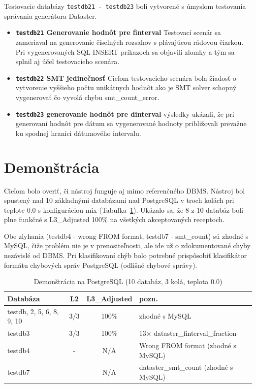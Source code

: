 Testovacie databázy \texttt{testdb21 - testdb23} boli vytvorené s úmyslom testovania správania generátora Dataster.

\begin{itemize}
    \item \textbf{\texttt{testdb21} Generovanie hodnôt pre finterval} Testovací scenár sa zameriaval na generovanie číselných rozsahov s plávajúcou rádovou čiarkou. Pri vygenerovaných SQL INSERT príkazoch sa objavili zlomky a tým sa splnil aj účel testovacieho scenára.
    \item \textbf{\texttt{testdb22} SMT jedinečnosť} Cieľom testovacieho scenára bola žiadosť o vytvorenie vyššieho počtu unikátnych hodnôt ako je SMT solver schopný vygenerovať čo vyvolá chybu smt\_count\_error.
    \item \textbf{\texttt{testdb23} generovanie hodnôt pre dinterval} výsledky ukázali, že pri generovaní hodnôt pre dátum sa vygenerované hodnoty približovali prevažne ku spodnej hranici dátumového intervalu.
\end{itemize}

\section{Demonštrácia}
Cieľom bolo overiť, či nástroj funguje aj mimo referenčného DBMS. Nástroj bol spustený nad 10 základnými databázami nad PostgreSQL v troch kolách pri teplote 0.0 s konfiguráciou mix (Tabuľka~\ref{tab:vysledky_demostracia}). Ukázalo sa, že 8 z 10 databáz boli plne funkčné s L3\_Adjusted 100\% na všetkých akceptovaných receptoch. 

Obe zlyhania (testdb4 - wrong FROM format, testdb7 - smt\_count) sú zhodné s MySQL, čiže problém nie je v prenositeľnosti, ale ide už o zdokumentované chyby nezávislé od DBMS. Pri klasifikovaní chýb bolo potrebné prispôsobiť klasifikátor formátu chybových správ PostgreSQL (odlišné chybové správy).

\label{sub:kap8_demonstracia}
\begin{table}[H]
    \centering
    \small
    \begin{tabular}{lc c l}
    \toprule
    \textbf{Databáza} & \textbf{L2} & \textbf{L3\_Adjusted} & \textbf{pozn.} \\
    \midrule
    testdb, 2, 5, 6, 8, 9, 10 & 3/3 & 100\% & zhodné s MySQL \\
    testdb3 & 3/3 & 100\% & 13$\times$ dataster\_finterval\_fraction \\
    testdb4 & -&N/A & Wrong FROM format (zhodné s MySQL) \\
    testdb7 & -&N/A & dataster\_smt\_count (zhodné s MySQL) \\
    \bottomrule
    \end{tabular}
    \caption{Demonštrácia na PostgreSQL (10 databáz, 3 kolá, teplota 0.0)}
    \label{tab:vysledky_demostracia}
\end{table}

